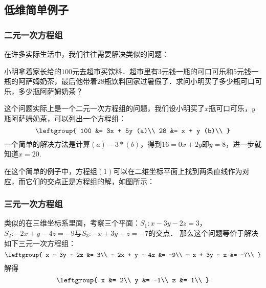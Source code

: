 
\subsection{低维简单例子}
\subsubsection{二元一次方程组}
在许多实际生活中，我们往往需要解决类似的问题：

小明拿着家长给的$100$元去超市买饮料．超市里有$3$元钱一瓶的可口可乐和$5$元钱一瓶的阿萨姆奶茶，最后他带着$28$瓶饮料回家过暑假了．求问小明买了多少瓶可口可乐，多少瓶阿萨姆奶茶？

这个问题实际上是一个二元一次方程组的问题，我们设小明买了$x$瓶可口可乐，$y$瓶阿萨姆奶茶，可以列出一个方程组：\begin{equation}
\leftgroup{
100 &= 3x + 5y (a)\\
28 &= x + y (b)\\
}\end{equation}
一个简单的解决方法是计算$(a)-3*(b)$，得到$16 = 0x + 2y$即$y = 8$，进一步就知道$x = 20$.

在这个简单的例子中，方程组$(1)$可以在二维坐标平面上找到两条直线作为对应，而它们的交点正是方程组的解，如图所示：
\subsubsection{三元一次方程组}
类似的在三维坐标系里面，考察三个平面：$S_1:x - 3y-2z=3$，$S_2:-2x+y-4z=-9$与$S_3:-x+3y-z=-7$的交点．
那么这个问题等价于解决如下三元一次方程组：\begin{equation}
\leftgroup{
x - 3y - 2z &= 3\\
- 2x + y - 4z &= -9\\
- x + 3y - z &= -7\\
}\end{equation}
解得\begin{equation}
\leftgroup{
x &= 2\\
y &= -1\\
z &= 1\\
}\end{equation}